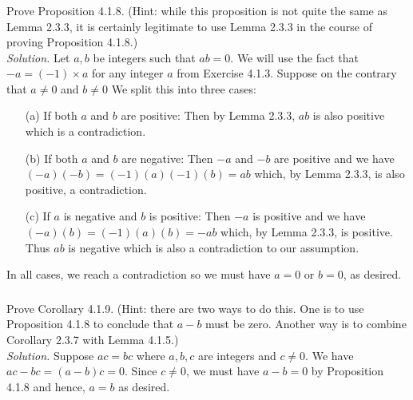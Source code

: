 \documentclass{amsart}
\theoremstyle{definition}
\newcommand{\soln}{\newline\textit{Solution.} }
\begin{document}
\subsubsection{} Prove Proposition 4.1.8. (Hint: while this proposition is not quite the same as Lemma 2.3.3, it is certainly legitimate to use Lemma 2.3.3 in the course of proving Proposition 4.1.8.) \\
\soln Let $a,b$ be integers such that $ab=0$. We will use the fact that $-a=(-1)\times a$ for any integer $a$ from Exercise 4.1.3. Suppose on the contrary that $a\neq 0$ and $b\neq 0$ We split this into three cases:
\begin{enumerate}
\item[(a)] If both $a$ and $b$ are positive: Then by Lemma 2.3.3, $ab$ is also positive which is a contradiction. 
\item[(b)] If both $a$ and $b$ are negative: Then $-a$ and $-b$ are positive and we have $(-a)(-b)=(-1)(a)(-1)(b)=ab$ which, by Lemma 2.3.3, is also positive, a contradiction. 
\item[(c)] If $a$ is negative and $b$ is positive: Then $-a$ is positive and we have $(-a)(b)=(-1)(a)(b)=-ab$ which, by Lemma 2.3.3, is positive. Thus $ab$ is negative which is also a contradiction to our assumption.
\end{enumerate}
In all cases, we reach a contradiction so we must have $a=0$ or $b=0$, as desired. \\

\subsubsection{} Prove Corollary 4.1.9. (Hint: there are two ways to do this. One is to use Proposition 4.1.8 to conclude that $a-b$ must be zero. Another way is to combine Corollary 2.3.7 with Lemma 4.1.5.) \\
\soln Suppose $ac=bc$ where $a,b,c$ are integers and $c\neq 0$. We have $ac-bc=(a-b)c=0$. Since $c\neq 0$, we must have $a-b=0$ by Proposition 4.1.8 and hence, $a=b$ as desired.
\end{document}
